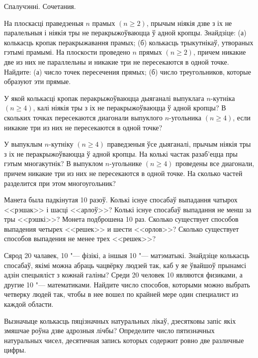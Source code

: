 \biLangHeader
{Спалучэнні.}
{Сочетания.}

\begin{problemList}

\problemItemSimple
{На плоскасці праведзеныя $n$ прамых $(n \ge 2)$, прычым ніякія дзве з іх не паралельныя
і ніякія тры не перакрыжоўваюцца ў адной кропцы. Знайдзіце: (а) колькасць кропак перакрыжавання прамых;
(б) колькасць трыкутнікаў, утвораных гэтымі прамымі.}
{На плоскости проведено $n$ прямых $(n \ge 2)$, причем никакие две из
них не параллельны и никакие три не пересекаются в одной точке.
Найдите: (а) число точек пересечения прямых; (б) число треугольников,
которые образуют эти прямые.}

\bigskip

\problemItemSimple
{У якой колькасці кропак перакрыжоўваюцца дыяганалі выпуклага $n$-кутніка
$(n \ge 4)$, калі ніякія тры з іх не перакрыжоўваюцца ў адной кропцы?}
{В скольких точках пересекаются диагонали выпуклого $n$-угольника
$(n \ge 4)$, если никакие три из них не пересекаются в одной точке?}

\bigskip

\problemItemSimple
{У выпуклым $n$-кутніку $(n \ge 4)$ праведзеныя ўсе дыяганалі, прычым
ніякія тры з іх не перакрыжоўваюцца ў адной кропцы. На колькі частак разаб'ецца
пры гэтым многакутнік?}
{В выпуклом $n$-угольнике $(n \ge 4)$ проведены все диагонали, причем
никакие три из них не пересекаются в одной точке. На сколько частей
разделится при этом многоугольник?}

\bigskip

\problemItemSimple
{Манета была падкінутая 10 разоў. Колькі існуе спосабаў выпадання чатырох
<<рэшак>> і шасці <<арлоў>>?
Колькі існуе спосабаў выпадання не менш за тры <<рэшкі>>?}
{Монета подброшена 10 раз. Сколько существует способов выпадения
четырех <<решек>> и шести <<орлов>>? Сколько существует способов выпадения
не менее трех <<решек>>?}

\bigskip

\problemItemSimple
{Сярод 20 чалавек, 10 "--- фізікі, а іншыя 10 "--- матэматыкі. Знайдзіце колькасць спосабаў,
якімі можна абраць чацвёрку людзей так, каб у яе ўвайшоў прынамсі адзін спецыяліст з кожнай галіны?}
{Среди 20 человек 10 являются физиками, а другие 10 "--- математиками.
Найдите число способов, которыми можно выбрать четверку людей так,
чтобы в нее вошел по крайней мере один специалист из каждой области.}

\bigskip

\problemItemSimple
{Вызначыце колькасць пяцізначных натуральных лікаў, дзесятковы запіс якіх змяшчае роўна дзве адрозныя лічбы?}
{Определите число пятизначных натуральных чисел, десятичная запись
которых содержит ровно две различные цифры.}


\end{problemList}

